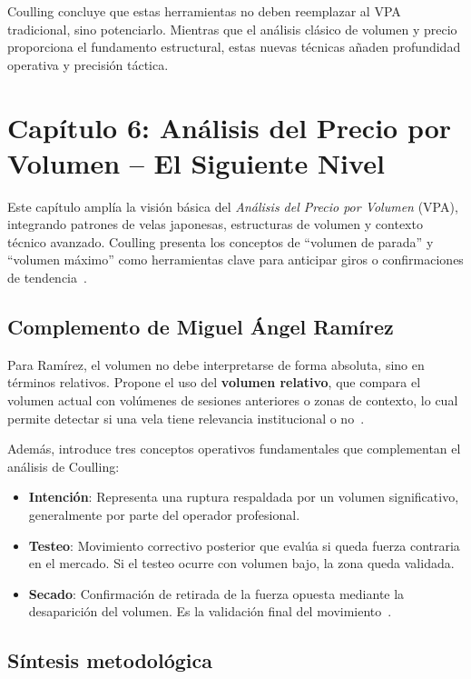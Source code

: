 Coulling concluye que estas herramientas no deben reemplazar al VPA tradicional, sino potenciarlo. Mientras que el análisis clásico de volumen y precio proporciona el fundamento estructural, estas nuevas técnicas añaden profundidad operativa y precisión táctica.


\section*{Cap\'itulo 6: An\'alisis del Precio por Volumen – El Siguiente Nivel}

Este cap\'itulo ampl\'ia la visi\'on b\'asica del \textit{An\'alisis del Precio por Volumen} (VPA), integrando patrones de velas japonesas, estructuras de volumen y contexto t\'ecnico avanzado. Coulling presenta los conceptos de ``volumen de parada'' y ``volumen m\'aximo'' como herramientas clave para anticipar giros o confirmaciones de tendencia~\cite{Coulling13}.

\subsection*{Complemento de Miguel \'Angel Ram\'irez}

Para Ram\'irez, el volumen no debe interpretarse de forma absoluta, sino en t\'erminos relativos. Propone el uso del \textbf{volumen relativo}, que compara el volumen actual con vol\'umenes de sesiones anteriores o zonas de contexto, lo cual permite detectar si una vela tiene relevancia institucional o no~\cite{ramirez18}.

Adem\'as, introduce tres conceptos operativos fundamentales que complementan el an\'alisis de Coulling:

\begin{itemize}
  \item \textbf{Intenci\'on}: Representa una ruptura respaldada por un volumen significativo, generalmente por parte del operador profesional.
  \item \textbf{Testeo}: Movimiento correctivo posterior que eval\'ua si queda fuerza contraria en el mercado. Si el testeo ocurre con volumen bajo, la zona queda validada.
  \item \textbf{Secado}: Confirmaci\'on de retirada de la fuerza opuesta mediante la desaparici\'on del volumen. Es la validaci\'on final del movimiento~\cite{ramirez18}.
\end{itemize}

\subsection*{S\'intesis metodol\'ogica}

